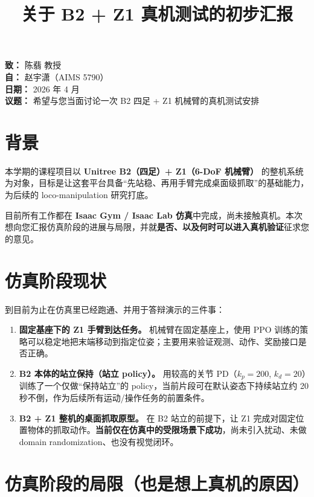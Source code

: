 \documentclass[11pt,a4paper]{ctexart}
\title{\vspace{-1.2cm}\bfseries 关于 B2 + Z1 真机测试的初步汇报}
\author{}
\date{}
\begin{document}
\maketitle
\vspace{-1.6cm}

\begin{flushleft}
\textbf{致：} 陈翡 教授 \\
\textbf{自：} 赵宇潇（AIMS 5790）\\
\textbf{日期：} 2026 年 4 月 \\
\textbf{议题：} 希望与您当面讨论一次 B2 四足 + Z1 机械臂的真机测试安排
\end{flushleft}

\section{背景}

本学期的课程项目以 \textbf{Unitree B2（四足）+ Z1（6-DoF 机械臂）} 的整机系统为对象，目标是让这套平台具备“先站稳、再用手臂完成桌面级抓取”的基础能力，为后续的 loco-manipulation 研究打底。

目前所有工作都在 \textbf{Isaac Gym / Isaac Lab 仿真}中完成，尚未接触真机。本次想向您汇报仿真阶段的进展与局限，并就\textbf{是否、以及何时可以进入真机验证}征求您的意见。

\section{仿真阶段现状}

到目前为止在仿真里已经跑通、并用于答辩演示的三件事：

\begin{enumerate}
  \item \textbf{固定基座下的 Z1 手臂到达任务。} 机械臂在固定基座上，使用 PPO 训练的策略可以稳定地把末端移动到指定位姿；主要用来验证观测、动作、奖励接口是否正确。
  \item \textbf{B2 本体的站立保持（站立 policy）。} 用较高的关节 PD（$k_p=200$, $k_d=20$）训练了一个仅做“保持站立”的 policy，当前片段可在默认姿态下持续站立约 20 秒不倒，作为后续所有运动/操作任务的前置条件。
  \item \textbf{B2 + Z1 整机的桌面抓取原型。} 在 B2 站立的前提下，让 Z1 完成对固定位置物体的抓取动作。\textbf{当前仅在仿真中的受限场景下成功}，尚未引入扰动、未做 domain randomization、也没有视觉闭环。
\end{enumerate}

\section{仿真阶段的局限（也是想上真机的原因）}
\end{document}
